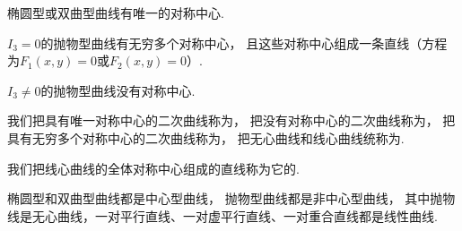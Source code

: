 \begin{theorem}
椭圆型或双曲型曲线有唯一的对称中心.
\end{theorem}

\begin{theorem}
\(I_3 = 0\)的抛物型曲线有无穷多个对称中心，
且这些对称中心组成一条直线（方程为\(F_1(x,y) = 0\)或\(F_2(x,y) = 0\)）.
\end{theorem}

\begin{theorem}
\(I_3 \neq 0\)的抛物型曲线没有对称中心.
\end{theorem}

我们把具有唯一对称中心的二次曲线称为，
把没有对称中心的二次曲线称为，
把具有无穷多个对称中心的二次曲线称为，
把无心曲线和线心曲线统称为.

我们把线心曲线的全体对称中心组成的直线称为它的.

椭圆型和双曲型曲线都是中心型曲线，
抛物型曲线都是非中心型曲线，
其中抛物线是无心曲线，一对平行直线、一对虚平行直线、一对重合直线都是线性曲线.
